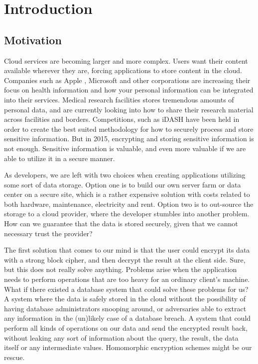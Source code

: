 \chapter{Introduction}
\label{chp:introduction}

\section{Motivation}

Cloud services are becoming larger and more complex. Users want their content available wherever they are, forcing applications to store content in the cloud. Companies such as Apple \cite{apple_health}, Microsoft \cite{microsoft_health} and other corporations are increasing their focus on health information and how your personal information can be integrated into their services. Medical research facilities stores tremendous amounts of personal data, and are currently looking into how to share their research material across facilities and borders. Competitions, such as iDASH \cite{iDASH} have been held in order to create the best suited methodology for how to securely process and store sensitive information. But in 2015, encrypting and storing sensitive information is not enough. Sensitive information is valuable, and even more valuable if we are able to utilize it in a secure manner. 

As developers, we are left with two choices when creating applications utilizing some sort of data storage. Option one is to build our own server farm or data center on a secure site, which is a rather expensive solution with costs related to both hardware, maintenance, electricity and rent. Option two is to out-source the storage to a cloud provider, where the developer stumbles into another problem. How can we guarantee that the data is stored securely, given that we cannot necessary trust the provider?

The first solution that comes to our mind is that the user could encrypt its data with a strong block cipher, and then decrypt the result at the client side. Sure, but this does not really solve anything. Problems arise when the application needs to perform operations that are too heavy for an ordinary client's machine. What if there existed a database system that could solve these problems for us? A system where the data is safely stored in the cloud without the possibility of having database administrators snooping around, or adversaries able to extract any information in the (un)likely case of a database breach. A system that could perform all kinds of operations on our data and send the encrypted result back, without leaking any sort of information about the query, the result, the data itself or any intermediate values. Homomorphic encryption schemes might be our rescue.

